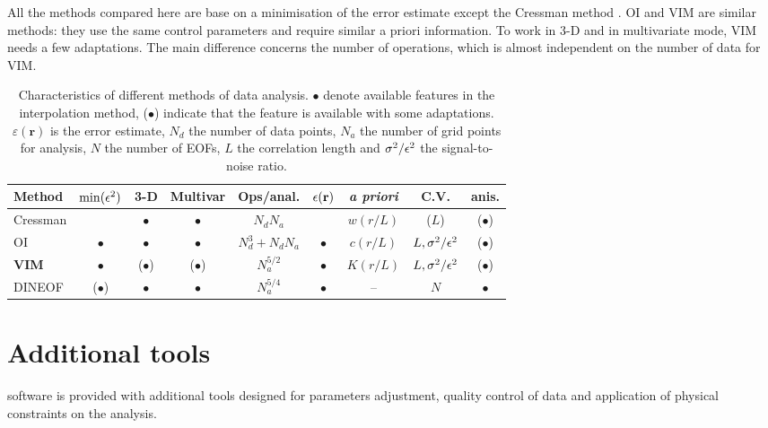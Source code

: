 All the methods compared here are base on a minimisation of the error estimate except the Cressman method \citep{CRESSMAN59}. OI and VIM are similar methods: they use the same control parameters and require similar a priori information. To work in 3-D and in multivariate mode, VIM needs a few adaptations. 
The main difference concerns the number of operations, which is almost independent on the number of data for VIM.

\begin{table}[htpb]
\caption[Characteristics of different methods of data analysis.]{Characteristics of different methods of data analysis. $\bullet$ denote available features in the interpolation method, ($\bullet$) indicate that the feature is available with some adaptations. $\varepsilon(\mathbf{r})$ is the error estimate, $N_d$ the number of data points, $N_a$ the number of grid points for analysis, $N$ the number of EOFs, $L$ the correlation length and $\sigma^2/ \epsilon^2$ the signal-to-noise ratio.\label{tabdata}}
\begin{tabular*}{0.99\textwidth}{@{\extracolsep{\fill}}lcccccccc}
\toprule
Method   & $\min(\epsilon^2)$	& 3-D       & Multivar & Ops/anal.        & $\epsilon(\mathbf{r})$& \textit{a priori}& C.V. & anis. \\ 
\midrule
Cressman &              	& $\bullet$& $\bullet$& $N_d N_a$        &                & $w(r/L)$   &($L$) & ($\bullet$) 			\\ 
OI    	 &   $\bullet$    	& $\bullet$& $\bullet$& $N_d^3+ N_d N_a$ & $\bullet$      & $c(r/L)$   & $L,\sigma^2/\epsilon^2$&($\bullet$)	\\ 
{\bf VIM}&   $\bullet$      &($\bullet$)& ($\bullet$)& $N_a^{5/2}$   & $\bullet$      & $K(r/L)$   & $L,\sigma^2/\epsilon^2$&($\bullet$)	\\
DINEOF   &  ($\bullet$)     & $\bullet$ &  $\bullet$ & $N_a^{5/4}$   & $\bullet$  	  &  --		   & $N$               & $\bullet$	\\ 
\bottomrule
\end{tabular*}
\end{table}

\section{Additional tools}

\diva software is provided with additional tools designed for parameters adjustment, quality control of data and application of physical constraints on the analysis.

